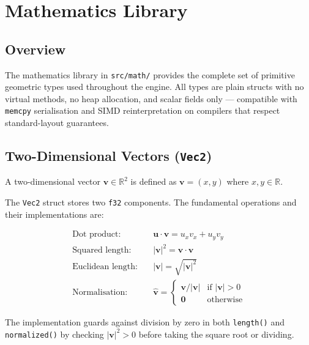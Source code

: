 \chapter{Mathematics Library}

\section{Overview}

The mathematics library in \texttt{src/math/} provides the complete set of
primitive geometric types used throughout the engine. All types are plain
structs with no virtual methods, no heap allocation, and scalar fields
only --- compatible with \texttt{memcpy} serialisation and SIMD reinterpretation
on compilers that respect standard-layout guarantees.

\section{Two-Dimensional Vectors (\texttt{Vec2})}

\begin{definition}[2-Vector]
A two-dimensional vector $\mathbf{v} \in \mathbb{R}^2$ is defined as
$\mathbf{v} = (x, y)$ where $x, y \in \mathbb{R}$.
\end{definition}

The \texttt{Vec2} struct stores two \texttt{f32} components. The fundamental
operations and their implementations are:

\begin{align}
  \text{Dot product:} \quad & \mathbf{u} \cdot \mathbf{v} = u_x v_x + u_y v_y \\
  \text{Squared length:} \quad & |\mathbf{v}|^2 = \mathbf{v} \cdot \mathbf{v} \\
  \text{Euclidean length:} \quad & |\mathbf{v}| = \sqrt{|\mathbf{v}|^2} \\
  \text{Normalisation:} \quad & \hat{\mathbf{v}} =
    \begin{cases} \mathbf{v} / |\mathbf{v}| & \text{if } |\mathbf{v}| > 0 \\ \mathbf{0} & \text{otherwise} \end{cases}
\end{align}

The implementation guards against division by zero in both
\texttt{length()} and \texttt{normalized()} by checking
$|\mathbf{v}|^2 > 0$ before taking the square root or dividing.

